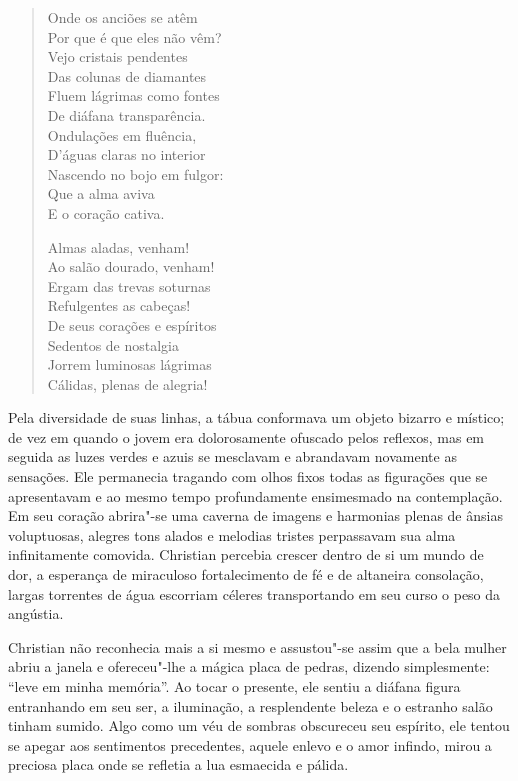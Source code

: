\begin{verse}
Onde os anciões se atêm\\
Por que é que eles não vêm?\\
Vejo cristais pendentes\\
Das colunas de diamantes\\
Fluem lágrimas como fontes\\
De diáfana transparência.\\
Ondulações em fluência,\\
D'águas claras no interior\\
Nascendo no bojo em fulgor:\\
Que a alma aviva\\
E o coração cativa.

Almas aladas, venham!\\
Ao salão dourado, venham!\\
Ergam das trevas soturnas\\
Refulgentes as cabeças!\\
De seus corações e espíritos\\
Sedentos de nostalgia\\
Jorrem luminosas lágrimas\\
Cálidas, plenas de alegria!
\end{verse}

Pela diversidade de suas linhas, a tábua conformava um objeto bizarro e
místico; de vez em quando o jovem era dolorosamente ofuscado pelos
reflexos, mas em seguida as luzes verdes e azuis se mesclavam e
abrandavam novamente as sensações. Ele permanecia tragando com olhos
fixos todas as figurações que se apresentavam e ao mesmo tempo
profundamente ensimesmado na contemplação. Em seu coração abrira"-se uma
caverna de imagens e harmonias plenas de ânsias voluptuosas, alegres
tons alados e melodias tristes perpassavam sua alma infinitamente
comovida. Christian percebia crescer dentro de si um mundo de dor, a
esperança de miraculoso fortalecimento de fé e de altaneira consolação,
largas torrentes de água escorriam céleres transportando em seu curso o
peso da angústia.

Christian não reconhecia mais a si mesmo e assustou"-se assim que a bela
mulher abriu a janela e ofereceu"-lhe a mágica placa de pedras, dizendo
simplesmente: ``leve em minha memória''. Ao tocar o presente, ele sentiu
a diáfana figura entranhando em seu ser, a iluminação, a resplendente
beleza e o estranho salão tinham sumido. Algo como um véu de sombras
obscureceu seu espírito, ele tentou se apegar aos sentimentos
precedentes, aquele enlevo e o amor infindo, mirou a preciosa placa
onde se refletia a lua esmaecida e pálida.

